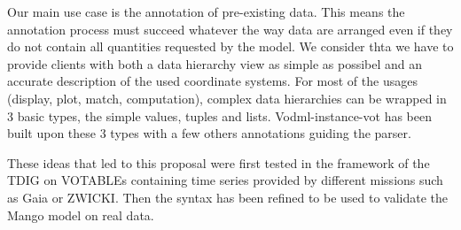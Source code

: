 \documentclass[11pt,a4paper]{ivoa}
\begin{document}
Our main use case is the annotation  of pre-existing data. This  means the annotation process must succeed whatever the way data are arranged even if they do not contain all quantities requested by the model.  
We consider thta we have to provide clients with both a data hierarchy view as simple as possibel and an accurate description of the used coordinate systems. 
For most of the usages (display, plot, match, computation),  complex data hierarchies can be wrapped in 3 basic types, the simple values,  tuples and  lists. Vodml-instance-vot  has been built upon these 3 types with a few others annotations guiding the parser.

These ideas that led to this proposal were first tested in the framework of the TDIG on VOTABLEs containing time series provided by different missions such as Gaia or ZWICKI. Then the syntax has been refined to be used to validate the Mango model on real data.










\end{document}

